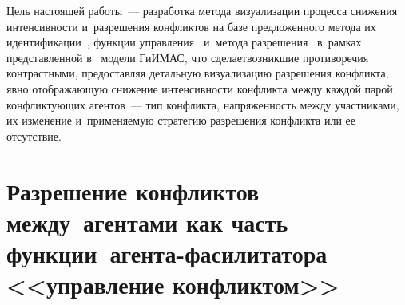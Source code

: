 \begin{multicols}{2}
  Цель настоящей работы~--- разработка метода визуализации процесса 
снижения интенсивности и~разрешения конфликтов на базе предложенного 
метода их идентификации~\cite{2-kir}, функции управления~\cite{3-kir} 
и~метода разрешения~\cite{4-kir} в~рамках представленной в~\cite{1-kir} 
модели \mbox{ГиИМАС}, что сделает\linebreak возникшие противоречия контрастными, 
предо\-став\-ляя детальную визуализацию разрешения конфликта, явно 
отображающую снижение интенсивности конфликта между каждой парой 
\mbox{конфликтующих} агентов~--- тип конфликта, напряженность между 
участниками, их изменение и~применяемую стратегию разрешения конфликта 
или ее отсутствие. 

\section{Разрешение конфликтов между~агентами как часть 
функции~агента-фасилитатора <<управление конфликтом>>}


\end{multicols}
